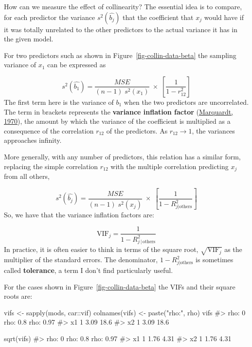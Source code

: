 \documentclass[
  letterpaper,
  10pt,
  krantz2]{krantz}
\makeatletter
\newenvironment{Shaded}{\begin{snugshade}}{\end{snugshade}}
\newcommand{\CommentTok}[1]{\textcolor[rgb]{0.37,0.37,0.37}{#1}}
\newcommand{\FunctionTok}[1]{\textcolor[rgb]{0.28,0.35,0.67}{#1}}
\newcommand{\NormalTok}[1]{\textcolor[rgb]{0.00,0.23,0.31}{#1}}
\newcommand{\OtherTok}[1]{\textcolor[rgb]{0.00,0.23,0.31}{#1}}
\newcommand{\SpecialCharTok}[1]{\textcolor[rgb]{0.37,0.37,0.37}{#1}}
\newcommand{\StringTok}[1]{\textcolor[rgb]{0.13,0.47,0.30}{#1}}
\newenvironment{kframe}{%
  \medskip{}
  \setlength{\fboxsep}{.8em}
  \def\at@end@of@kframe{}%
  \ifinner\ifhmode%
  \def\at@end@of@kframe{\end{minipage}}%
  \begin{minipage}{\columnwidth}%
  \fi\fi%
  \def\FrameCommand##1{\hskip\@totalleftmargin \hskip-\fboxsep
  \colorbox{shadecolor}{##1}\hskip-\fboxsep
      \hskip-\linewidth \hskip-\@totalleftmargin \hskip\columnwidth}%
  \MakeFramed {\advance\hsize-\width
    \@totalleftmargin\z@ \linewidth\hsize
    \@setminipage}}%
{\par\unskip\endMakeFramed%
  \at@end@of@kframe}
\renewenvironment{Shaded}{\begin{kframe}}{\end{kframe}}
\makeatother
\begin{document}
How can we measure the effect of collinearity? The essential idea is to
compare, for each predictor the variance \(s^2 (\widehat{b_j})\) that
the coefficient that \(x_j\) would have if it was totally unrelated to
the other predictors to the actual variance it has in the given model.

For two predictors such as shown in Figure~\ref{fig-collin-data-beta}
the sampling variance of \(x_1\) can be expressed as

\[
s^2 (\widehat{b_1}) = \frac{MSE}{(n-1) \; s^2(x_1)} \; \times \; \left[ \frac{1}{1-r^2_{12}} \right]
\] The first term here is the variance of \(b_1\) when the two
predictors are uncorrelated. The term in brackets represents the
\textbf{variance inflation factor}
(\protect\hyperlink{ref-Marquardt:1970}{Marquardt, 1970}), the amount by
which the variance of the coefficient is multiplied as a consequence of
the correlation \(r_{12}\) of the predictors. As
\(r_{12} \rightarrow 1\), the variances approaches infinity.

More generally, with any number of predictors, this relation has a
similar form, replacing the simple correlation \(r_{12}\) with the
multiple correlation predicting \(x_j\) from all others,

\[
s^2 (\widehat{b_j}) = \frac{MSE}{(n-1) \; s^2(x_j)} \; \times \; \left[ \frac{1}{1-R^2_{j | \text{others}}} \right]
\] So, we have that the variance inflation factors are:

\[
\text{VIF}_j = \frac{1}{1-R^2_{j \,|\, \text{others}}} 
\] In practice, it is often easier to think in terms of the square root,
\(\sqrt{\text{VIF}_j}\) as the multiplier of the standard errors. The
denominator, \(1-R^2_{j | \text{others}}\) is sometimes called
\textbf{tolerance}, a term I don't find particularly useful.

For the cases shown in Figure~\ref{fig-collin-data-beta} the VIFs and
their square roots are:

\begin{Shaded}
\begin{Highlighting}[]
\NormalTok{vifs }\OtherTok{\textless{}{-}} \FunctionTok{sapply}\NormalTok{(mods, car}\SpecialCharTok{::}\NormalTok{vif)}
\FunctionTok{colnames}\NormalTok{(vifs) }\OtherTok{\textless{}{-}} \FunctionTok{paste}\NormalTok{(}\StringTok{"rho:"}\NormalTok{, rho)}
\NormalTok{vifs}
\CommentTok{\#\textgreater{}    rho: 0 rho: 0.8 rho: 0.97}
\CommentTok{\#\textgreater{} x1      1     3.09      18.6}
\CommentTok{\#\textgreater{} x2      1     3.09      18.6}

\FunctionTok{sqrt}\NormalTok{(vifs)}
\CommentTok{\#\textgreater{}    rho: 0 rho: 0.8 rho: 0.97}
\CommentTok{\#\textgreater{} x1      1     1.76      4.31}
\CommentTok{\#\textgreater{} x2      1     1.76      4.31}
\end{Highlighting}
\end{Shaded}
\end{document}
